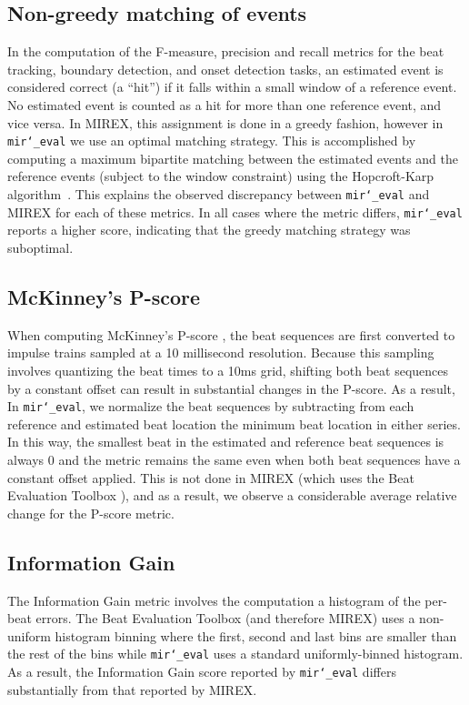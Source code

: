 \documentclass{article}
\def\mireval{\texttt{mir\char`_eval}}
\begin{document}
\subsection{Non-greedy matching of events}

In the computation of the F-measure, precision and recall metrics for the beat tracking, boundary detection, and onset detection tasks, an estimated event is considered correct (a ``hit'') if it falls within a small window of a reference event.
No estimated event is counted as a hit for more than one reference event, and vice versa.
In MIREX, this assignment is done in a greedy fashion, however in \mireval{} we use an optimal matching strategy.
This is accomplished by computing a maximum bipartite matching between the estimated events and the reference events (subject to the window constraint) using the Hopcroft-Karp algorithm~\cite{hopcroft1973n}.
This explains the observed discrepancy between \mireval{} and MIREX for each of these metrics.
In all cases where the metric differs, \mireval{} reports a higher score, indicating that the greedy matching strategy was suboptimal.

\subsection{McKinney's P-score}

When computing McKinney's P-score \cite{davies2009evaluation}, the beat sequences are first converted to impulse trains sampled at a 10 millisecond resolution.
Because this sampling involves quantizing the beat times to a 10ms grid, shifting both beat sequences by a constant offset can result in substantial changes in the P-score.
As a result, In \mireval{}, we normalize the beat sequences by subtracting from each reference and estimated beat location the minimum beat location in either series.
In this way, the smallest beat in the estimated and reference beat sequences is always $0$ and the metric remains the same even when both beat sequences have a constant offset applied.
This is not done in MIREX (which uses the Beat Evaluation Toolbox \cite{davies2009evaluation}), and as a result, we observe a considerable average relative change for the P-score metric.

\subsection{Information Gain}

The Information Gain metric \cite{davies2009evaluation} involves the computation a histogram of the per-beat errors.
The Beat Evaluation Toolbox (and therefore MIREX) uses a non-uniform histogram binning where the first, second and last bins are smaller than the rest of the bins while \mireval{} uses a standard uniformly-binned histogram.
As a result, the Information Gain score reported by \mireval{} differs substantially from that reported by MIREX.
\end{document}
